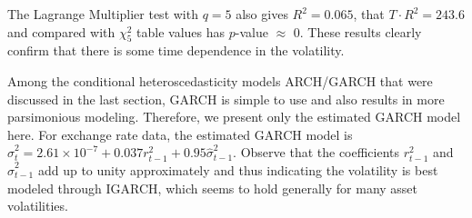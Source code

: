 The Lagrange Multiplier test with $q=5$ also gives $R^2= 0.065$, that $T\cdot R^2= 243.6$ and compared with $\chi_5^2$ table values has $p$-value $\approx$ 0. These results clearly confirm that there is some time dependence in the volatility.


Among the conditional heteroscedasticity models ARCH/GARCH that were discussed in the last section, GARCH is simple to use and also results in more parsimonious modeling. Therefore, we present only the estimated GARCH model here. For exchange rate data, the estimated GARCH model is $\hat{\sigma}_t^2 = 2.61 \times 10^{-7} + 0.037r_{t-1}^2 + 0.95\hat{\sigma}_{t-1}^2$. Observe that the coefficients $r_{t-1}^2$ and $\hat{\sigma}_{t-1}^2$ add up to unity approximately and thus indicating the volatility is best modeled through IGARCH, which seems to hold generally for many asset volatilities.
